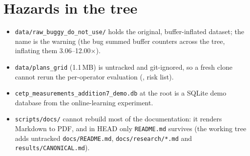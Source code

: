 \section{Hazards in the tree}
\begin{itemize}
\item \texttt{data/raw\_buggy\_do\_not\_use/} holds the original, buffer-inflated dataset; the name is the
  warning (the bug summed buffer counters across the tree, inflating them 3.06--12.00$\times$).
\item \texttt{data/plans\_grid} (1.1\,MB) is untracked and git-ignored, so a fresh clone cannot rerun the
  per-operator evaluation (\evPACK, risk list).
\item \texttt{cetp\_measurements\_addition7\_demo.db} at the root is a SQLite demo database from the
  online-learning experiment.
\item \texttt{scripts/docs/} cannot rebuild most of the documentation: it renders Markdown to PDF, and in HEAD only \texttt{README.md} survives (the working tree adds untracked \texttt{docs/README.md}, \texttt{docs/research/*.md} and \texttt{results/CANONICAL.md}).
\end{itemize}
